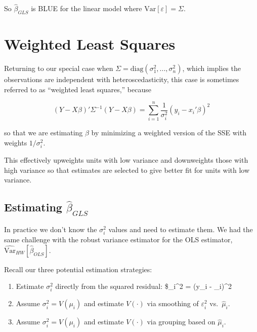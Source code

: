\documentclass[
  letterpaper,
  DIV=11,
  numbers=noendperiod]{scrreport}
\providecommand{\tightlist}{%
  \setlength{\itemsep}{0pt}\setlength{\parskip}{0pt}}\usepackage{longtable,booktabs,array}
\begin{document}
So \(\hat \beta_{GLS}\) is BLUE for the linear model where
\(\text{Var}[\varepsilon] = \Sigma\).


\hypertarget{weighted-least-squares}{%
\chapter{Weighted Least Squares}\label{weighted-least-squares}}

Returning to our special case when
\(\Sigma = \text{diag}(\sigma_1^2, ..., \sigma_n^2)\), which implies the
observations are independent with heteroscedasticity, this case is
sometimes referred to as ``weighted least squares,'' because

\[
(Y - X \beta)' \Sigma^{-1} (Y-X\beta) = \sum_{i=1}^n \frac{1}{\sigma_i^2} (y_i - x_i' \beta)^2
\]

so that we are estimating \(\beta\) by minimizing a weighted version of
the SSE with weights \(1/\sigma_i^2\).

This effectively upweights units with low variance and downweights those
with high variance so that estimates are selected to give better fit for
units with low variance.

\hypertarget{estimating-hat-beta_gls}{%
\section{\texorpdfstring{Estimating
\(\hat \beta_{GLS}\)}{Estimating \textbackslash hat \textbackslash beta\_\{GLS\}}}\label{estimating-hat-beta_gls}}

In practice we don't know the \(\sigma_i^2\) values and need to estimate
them. We had the same challenge with the robust variance estimator for
the OLS estimator, \(\widehat{\text{Var}}_{HW}[\hat\beta_{OLS}]\).

Recall our three potential estimation strategies:

\begin{enumerate}
\def\labelenumi{\arabic{enumi}.}
\tightlist
\item
  Estimate \(\sigma_i^2\) directly from the squared residual:
  \$\hat \varepsilon\_i\^{}2 = (y\_i - \hat \mu\_i)\^{}2
\item
  Assume \(\sigma_i^2 = V(\mu_i)\) and estimate \(V(\cdot)\) via
  smoothing of \(\varepsilon_i^2\) vs.~\(\hat \mu_i\).
\item
  Assume \(\sigma_i^2 = V(\mu_i)\) and estimate \(V(\cdot)\) via
  grouping based on \(\hat \mu_i\).
\end{enumerate}
\end{document}
